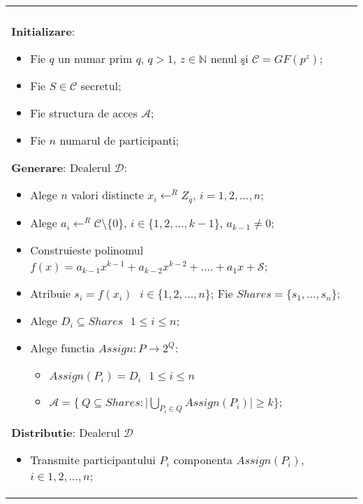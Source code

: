 \documentclass{llncs}
\begin{document}
\begin{figure*}[h!]

\begin{tabular}{|p{\textwidth}|}
\hline

\\
\hspace{.1in}
\textbf{Initializare}: 
	\begin{itemize}
		\item Fie $q$ un numar prim $q$, $q > 1$, $z \in \mathbb{N}$ nenul \c{s}i $\mathcal{C} = GF(p^z)$;
		\item Fie $S \in \mathcal{C}$ secretul; 
		\item Fie structura de acces $\mathcal{A}$;
		\item Fie $n$ numarul de participanti;
	\end{itemize}

\medskip

\hspace{.1in}
\textbf{Generare}: Dealerul $\mathcal{D}$:
	\begin{itemize}
		\setlength{\itemsep}{5pt}
		\item Alege $n$ valori distincte $x_i \leftarrow^R Z_q \text{, }i = 1,2,\dots,n$;
		\item Alege $a_{i} \leftarrow^R \mathcal{C} \setminus \{0\} \text{, }i \in \{1,2,\dots,{k - 1}\}$, $a_{k-1} \neq 0$;
		\item Construieste polinomul $f(x) = a_{k - 1}x ^ {k-1} + a_{k-2}x ^ {k - 2} + .... + a_1x + \mathcal{S}$;
		\item Atribuie $s_i = f(x_i) \text{ } i \in \{1,2,\dots,n\}$; Fie $Shares = \{ s_1, \dots, s_n \}$;
		\item Alege $D_i \subseteq Shares \text{ } 1 \leq i \leq n$;
		\item Alege functia $Assign: P \rightarrow 2^Q$:
			\begin{itemize}
				\item $Assign(P_i) = D_i \text{ } 1 \leq i \leq n$
				\item $\mathcal{A} = \bigg \{ \ Q \subseteq Shares: \bigg| \underset{P_i \in Q}{{\bigcup}} Assign(P_i) \bigg| \geq k \bigg \}$;
			\end{itemize}
	\end{itemize}
\medskip

\hspace{.1in}
\textbf{Distributie}: Dealerul $\mathcal{D}$
	\begin{itemize}
		\item Transmite participantului $P_i$ componenta $Assign(P_i)$, $i \in 1,2,\dots,n$;
	\end{itemize}


\end{tabular}
\end{figure*}
\end{document}
